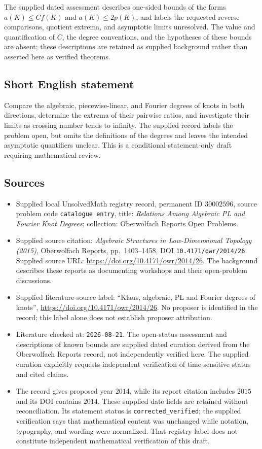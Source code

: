 \documentclass[11pt]{article}
\begin{document}
The supplied dated assessment describes one-sided bounds of the forms \(a(K)\leq C f(K)\) and \(a(K)\leq 2p(K)\), and labels the requested reverse comparisons, quotient extrema, and asymptotic limits unresolved. The value and quantification of \(C\), the degree conventions, and the hypotheses of these bounds are absent; these descriptions are retained as supplied background rather than asserted here as verified theorems.
\subsection{Short English statement}
Compare the algebraic, piecewise-linear, and Fourier degrees of knots in both directions, determine the extrema of their pairwise ratios, and investigate their limits as crossing number tends to infinity. The supplied record labels the problem open, but omits the definitions of the degrees and leaves the intended asymptotic quantifiers unclear. This is a conditional statement-only draft requiring mathematical review.
\subsection{Sources}
\begin{itemize}
\item Supplied local UnsolvedMath registry record, permanent ID \(30002596\), source problem code \texttt{catalogue entry}, title: \emph{Relations Among Algebraic PL and Fourier Knot Degrees}; collection: Oberwolfach Reports Open Problems.
\item Supplied source citation: \emph{Algebraic Structures in Low-Dimensional Topology (2015)}, Oberwolfach Reports, pp.\ 1403--1458, DOI \texttt{10.4171/owr/2014/26}. Supplied source URL: \url{https://doi.org/10.4171/owr/2014/26}. The background describes these reports as documenting workshops and their open-problem discussions.
\item Supplied literature-source label: ``Klaus, algebraic, PL and Fourier degrees of knots'', \url{https://doi.org/10.4171/owr/2014/26}. No proposer is identified in the record; this label alone does not establish proposer attribution.
\item Literature checked at: \texttt{2026-08-21}. The open-status assessment and descriptions of known bounds are supplied dated curation derived from the Oberwolfach Reports record, not independently verified here. The supplied curation explicitly requests independent verification of time-sensitive status and cited claims.
\item The record gives proposed year \(2014\), while its report citation includes \(2015\) and its DOI contains \(2014\). These supplied date fields are retained without reconciliation. Its statement status is \texttt{corrected\_verified}; the supplied verification says that mathematical content was unchanged while notation, typography, and wording were normalized. That registry label does not constitute independent mathematical verification of this draft.
\end{itemize}
\end{document}
